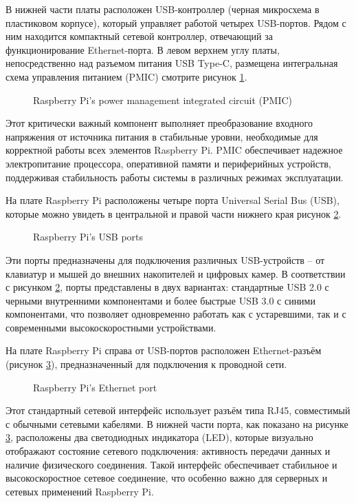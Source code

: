 В нижней части платы расположен USB-контроллер (черная микросхема в пластиковом корпусе), который управляет работой четырех USB-портов. Рядом с ним находится компактный сетевой контроллер, отвечающий за функционирование Ethernet-порта. В левом верхнем углу платы, непосредственно над разъемом питания USB Type-C, размещена интегральная схема управления питанием (PMIC) смотрите рисунок \ref{fig:pmic}.

\begin{figure}[H]
	\centering
	\caption{Raspberry Pi’s power management integrated circuit (PMIC)}
	\label{fig:pmic}
\end{figure}

Этот критически важный компонент выполняет преобразование входного напряжения от источника питания в стабильные уровни, необходимые для корректной работы всех элементов Raspberry Pi. PMIC обеспечивает надежное электропитание процессора, оперативной памяти и периферийных устройств, поддерживая стабильность работы системы в различных режимах эксплуатации.

На плате Raspberry Pi расположены четыре порта Universal Serial Bus (USB), которые можно увидеть в центральной и правой части нижнего края рисунок \ref{fig:usb}.

\begin{figure}[H]
	\centering
	\caption{Raspberry Pi's USB ports}
	\label{fig:usb}
\end{figure}

Эти порты предназначены для подключения различных USB-устройств -- от клавиатур и мышей до внешних накопителей и цифровых камер. В соответствии с рисунком \ref{fig:usb}, порты представлены в двух вариантах: стандартные USB 2.0 с черными внутренними компонентами и более быстрые USB 3.0 с синими компонентами, что позволяет одновременно работать как с устаревшими, так и с современными высокоскоростными устройствами.

На плате Raspberry Pi справа от USB-портов расположен Ethernet-разъём (рисунок \ref{fig:ethernet}), предназначенный для подключения к проводной сети.

\begin{figure}[H]
	\centering
	\caption{Raspberry Pi’s Ethernet port}
	\label{fig:ethernet}
\end{figure}

Этот стандартный сетевой интерфейс использует разъём типа RJ45, совместимый с обычными сетевыми кабелями. В нижней части порта, как показано на рисунке \ref{fig:ethernet}, расположены два светодиодных индикатора (LED), которые визуально отображают состояние сетевого подключения: активность передачи данных и наличие физического соединения. Такой интерфейс обеспечивает стабильное и высокоскоростное сетевое соединение, что особенно важно для серверных и сетевых применений Raspberry Pi.

